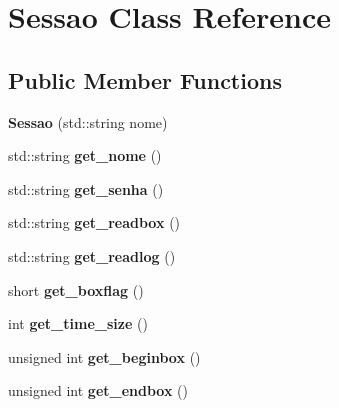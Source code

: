 \hypertarget{class_sessao}{}\section{Sessao Class Reference}
\label{class_sessao}
\subsection*{Public Member Functions}
\begin{DoxyCompactItemize}
\item 
\mbox{\label{class_sessao_aa8c42134ff2b92a6a8f426e3065fcc29}} 
{\bfseries Sessao} (std\+::string nome)
\item 
\mbox{\label{class_sessao_a8f62aa2369fd2f1a7477aec68d807b8d}} 
std\+::string {\bfseries get\+\_\+nome} ()
\item 
\mbox{\label{class_sessao_a9c5414eeab3c288ea110c48bc51e0a88}} 
std\+::string {\bfseries get\+\_\+senha} ()
\item 
\mbox{\label{class_sessao_a75c5556b287eae781f4ae8db3457e8cb}} 
std\+::string {\bfseries get\+\_\+readbox} ()
\item 
\mbox{\label{class_sessao_a75fc2334200fdb610e1216aa21ec7f25}} 
std\+::string {\bfseries get\+\_\+readlog} ()
\item 
\mbox{\label{class_sessao_ab6e003b3051e32131157de963e807bfc}} 
short {\bfseries get\+\_\+boxflag} ()
\item 
\mbox{\label{class_sessao_ae29ad55f6a648c367d211e4305ba6cab}} 
int {\bfseries get\+\_\+time\+\_\+size} ()
\item 
\mbox{\label{class_sessao_ac5572d439ea142cba35e4ae43f354b29}} 
unsigned int {\bfseries get\+\_\+beginbox} ()
\item 
\mbox{\label{class_sessao_aa612b5add942c488f35d53afa6a25bf7}} 
unsigned int {\bfseries get\+\_\+endbox} ()
\item 
\mbox{\label{class_sessao_aedbdd081241625fc46885767bba3666a}} 

\end{DoxyCompactItemize}
